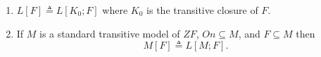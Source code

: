 \begin{enumerate}
\item $L[F] \triangleq L[K_0; F]$ where $K_0$ is the transitive closure of $F$.
\item If $M$ is a standard transitive model of $ZF$, $On \subseteq M$, and $F \subseteq M$ then
$$M[F] \triangleq L[M; F].$$
\end{enumerate}
